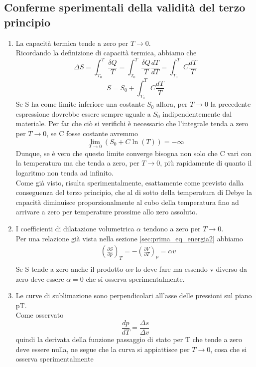 \documentclass[
10pt, %
a4paper, %
oneside, %
headinclude,footinclude, %
BCOR5mm, %
]{scrartcl}
\begin{document}
\subsection{Conferme sperimentali della validità del terzo principio}
\begin{enumerate}
	\item La capacità termica tende a zero per \(T \to 0\).\\
	Ricordando la definizione di capacità termica, abbiamo che 
	\[\Delta S = \int_{T_0}^{T}\frac{\delta Q}{T}=\int_{T_0}^{T}\frac{\delta Q}{T}\frac{dT}{dT}= \int_{T_0}^{T}C\frac{dT}{T}\]
	\[S = S_0 + \int_{T_0}^{T}C\frac{dT}{T}\]
	Se S ha come limite inferiore una costante \(S_0\) allora, per \(T\to0\) la precedente espressione dovrebbe essere sempre uguale a \(S_0\) indipendentemente dal materiale. Per far che ciò si verifichi è necessario che l'integrale tenda a zero per \(T\to0\), se C fosse costante avremmo
	\[\lim_{T\to 0}( S_0+C \ln(T))= -\infty \]
	Dunque, se è vero che questo limite converge bisogna non solo che C vari con la temperatura ma che tenda a zero, per \(T\to0\), più rapidamente di quanto il logaritmo non tenda ad infinito.\\
	Come già visto, risulta sperimentalmente, esattamente come previsto dalla conseguenza del terzo principio, che al di sotto della temperatura di Debye la capacità diminuisce proporzionalmente al cubo della temperatura fino ad arrivare a zero per temperature prossime allo zero assoluto.
	\item I coefficienti di dilatazione volumetrica $\alpha$ tendono a zero per \(T\to 0\).\\
	Per una relazione già vista nella sezione \ref{sec:prima_eq_energia2} abbiamo
	\begin{align*}
		&\left(\frac{\partial S}{\partial p}\right)_T = - \left(\frac{\partial V}{\partial T}\right)_p = \alpha v\\
	\end{align*}
	Se S tende a zero anche il prodotto \(\alpha v\) lo deve fare ma essendo v diverso da zero deve essere \(\alpha = 0\) che si osserva sperimentalmente. 
	\item Le curve di sublimazione sono perpendicolari all’asse delle pressioni sul piano pT.\\
	Come osservato \[\frac{dp}{dT} = \frac{\Delta s}{\Delta v}\] quindi la derivata della funzione passaggio di stato per T che tende a zero deve essere nulla, ne segue che la curva si appiattisce per \(T\to 0\), cosa che si osserva sperimentalmente
\end{enumerate}
\end{document}
